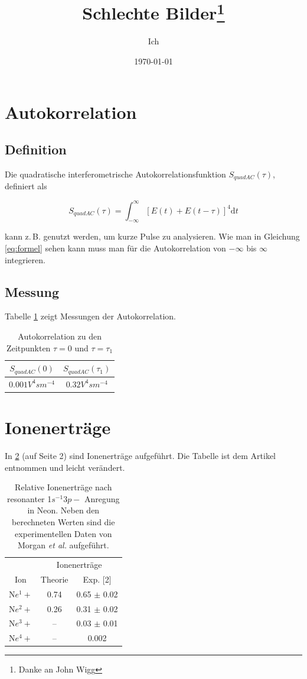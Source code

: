 \documentclass[a4paper, 10pt,onecolumn, captions=tableheading]{scrartcl}
\title{Schlechte Bilder\thanks{Danke an John Wigg}}
\author{Ich} %
\date{\today}
\begin{document}
\tableofcontents
\listoffigures
\listoftables

\section{Autokorrelation }
\subsection{Definition}

Die quadratische interferometrische Autokorrelationsfunktion $S_{quadAC}(\tau)$, definiert als
\begin{center}
	\begin{equation}
		S_{quadAC}(\tau)=\int_{-\infty}^{\infty}[E(t)+E(t-\tau)]^4\mathrm{d}t
		\label{eq:formel}
	\end{equation}
\end{center}
kann z.\,B. genutzt werden, um kurze Pulse zu analysieren. Wie man in Gleichung \eqref{eq:formel} sehen kann muss man für die Autokorrelation von $-\infty$ bis $\infty$ integrieren.

\subsection{Messung}
Tabelle \ref{Tabelle1} zeigt Messungen der Autokorrelation.
\begin{table}[h!]
\centering
\caption{Autokorrelation zu den Zeitpunkten $\tau =0$  und $\tau=\tau_1$}
\label{Tabelle1}
\begin{tabular}{|c|c|}
\hline \hline
$S_{quadAC}(0)$ & $S_{quadAC}(\tau_1)$\\ \hline
$0.001 V^4sm^{-4}$ & $0.32 V^4sm^{-4}$\\ \hline \hline
\end{tabular}
\end{table}
\section{Ionenerträge}

In \ref{Tabelle2} (auf Seite 2) sind Ionenerträge aufgeführt. Die Tabelle ist dem Artikel \cite{Stock} entnommen und leicht verändert.

\begin{table}[!h]
\centering
\caption{Relative Ionenerträge nach resonanter 1$s^{-1}3p-$ Anregung in Neon. Neben den berechneten Werten sind die experimentellen Daten von Morgan \textit{et al.} \cite{Morgan} aufgeführt.}
\label{Tabelle2}
\begin{tabular}{ccc}
\hline \hline
&\multicolumn{2}{c}{Ionenerträge}\\ \cline{2-3}
Ion & Theorie & Exp. [2] \\ \hline
N$e^1+$ & 0.74 & 0.65 $\pm$ 0.02\\
N$e^2+$ & 0.26 & 0.31 $\pm$ 0.02 \\ 
N$e^3+$ & -- & 0.03 $\pm$ 0.01\\
N$e^4+$ & -- & 0.002\\
\hline \hline

\end{tabular}
\end{table}
\end{document}
